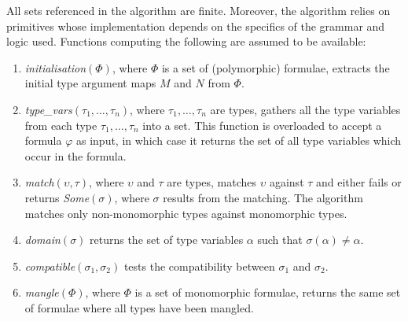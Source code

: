 \documentclass[runningheads]{llncs}
\begin{document}
All sets referenced in the algorithm are %
finite. Moreover, the algorithm relies on primitives whose implementation depends on the specifics of the grammar and logic used. %
Functions computing the following are assumed to be available: 
\begin{enumerate}
   \item[\labelitemi] \emph{initialisation\((\Phi)\)}, where \(\Phi\) is a set of (polymorphic) formulae, extracts the initial type argument maps \(M\) and \(N\) from \(\Phi\).
   \item[\labelitemi] \emph{type\_vars\((\tau_1, \dots, \tau_n)\)}, where \(\tau_1, \dots,\tau_n\) are types, gathers all the type variables from each type \(\tau_1, \dots, \tau_n\) into a set. This function is overloaded to accept a formula \(\varphi\) as input, in which case it returns the set of all type variables which occur in the formula.
   \item[\labelitemi] \emph{match\((\upsilon, \tau)\)}, where \(\upsilon\) and \(\tau\) are types, matches \(\upsilon\) against \(\tau\) and either fails or returns \emph{Some\((\sigma)\)}, where \(\sigma\) results from the matching. The algorithm matches only non-monomorphic types against monomorphic types.
   \item[\labelitemi] \emph{domain\((\sigma)\)} %
   returns the set of type variables \(\alpha\) such that \(\sigma(
   \alpha) \not= \alpha\).
   \item[\labelitemi] \emph{compatible\((\sigma_1, \sigma_2)\)} %
   tests the compatibility between \(\sigma_1\) and \(\sigma_2\).
   \item[\labelitemi] \emph{mangle\((\Phi)\)}, where \(\Phi\) is a set of monomorphic formulae, returns the same set of formulae where all types have been mangled.
\end{enumerate}
\end{document}

